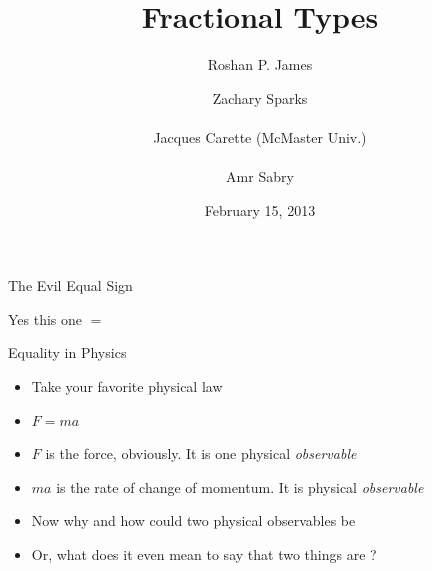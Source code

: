 \documentclass[11pt]{beamer}
\title{Fractional Types}
\author{Roshan P. James \and Zachary Sparks \\ ~ \\ Jacques Carette (McMaster Univ.) 
\\ ~ \\ Amr Sabry}
\institute{}
\date{February 15, 2013}
\newcommand{\red}[1]{{\color{red}{#1}}}
\begin{document}
\maketitle

\begin{frame}{}

\vfill
{\Large \centerline{The Evil Equal Sign}}

\vfill

\pause

{\Large \centerline{Yes this one \qquad $=$}}
\vfill

\end{frame}

\begin{frame}{Equality in Physics}

\begin{itemize}

\vfill\item Take your favorite physical law

\vfill\item $F = m a$

\vfill\item $F$ is the force, obviously. It is one physical \emph{observable}

\vfill\item $m a$ is the rate of change of momentum. It is \red{another}
physical \emph{observable}

\vfill\item Now why and how could two \red{different} physical observables be
\red{equal}

\vfill\item Or, what does it even mean to say that two \red{different} things
are \red{the same}?

\end{itemize}

\vfill

\end{frame}
\end{document}
